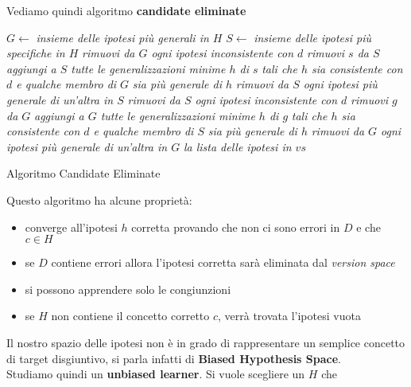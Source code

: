 \documentclass[a4paper,12pt, oneside]{book}
\begin{document}
Vediamo quindi algoritmo \textbf{candidate eliminate}
\begin{algorithm}[H]
  \begin{algorithmic}
    \State $G\gets$ \textit{insieme delle ipotesi più generali in $H$}
    \State $S\gets$ \textit{insieme delle ipotesi più specifiche in $H$}
    \State \textit{rimuovi da $G$ ogni ipotesi inconsistente con $d$}
    \State \textit{rimuovi $s$ da $S$}
    \State
    \State \textit{aggiungi a $S$ tutte le generalizzazioni minime $h$ di $s$}
    \State \textit{tali che $h$ sia consistente con $d$ e qualche membro di $G$}
    \State \textit{sia più generale di $h$}
    \EndFor
    \State \textit{rimuovi da $S$ ogni ipotesi più generale di un'altra in $S$}
    \Else
    \State \textit{rimuovi da $S$ ogni ipotesi inconsistente con $d$}
    \State \textit{rimuovi $g$ da $G$}
    \State
    \State \textit{aggiungi a $G$ tutte le generalizzazioni minime $h$ di $g$}
    \State \textit{tali che $h$ sia consistente con $d$ e qualche membro di $S$}
    \State \textit{sia più generale di $h$}
    \EndFor
    \State \textit{rimuovi da $G$ ogni ipotesi più generale di un'altra in $G$}
    \EndIf
    \EndFor
    \Return \textit{la lista delle ipotesi in $vs$}
    \EndFunction
  \end{algorithmic}
  \caption{Algoritmo Candidate Eliminate}
\end{algorithm}
Questo algoritmo ha alcune proprietà:
\begin{itemize}
  \item converge all'ipotesi $h$ corretta provando che non ci sono errori in $D$
  e che $c\in H$
  \item se $D$ contiene errori allora l'ipotesi corretta sarà eliminata dal
  \textit{version space}
  \item si possono apprendere solo le congiunzioni
  \item se $H$ non contiene il concetto corretto $c$, verrà trovata l'ipotesi
  vuota
\end{itemize}
Il nostro spazio delle ipotesi non è in grado di rappresentare un semplice
concetto di target disgiuntivo, si parla infatti di \textbf{Biased Hypothesis
  Space}. \\
Studiamo quindi un \textbf{unbiased learner}. Si vuole scegliere un $H$ che
\end{document}
